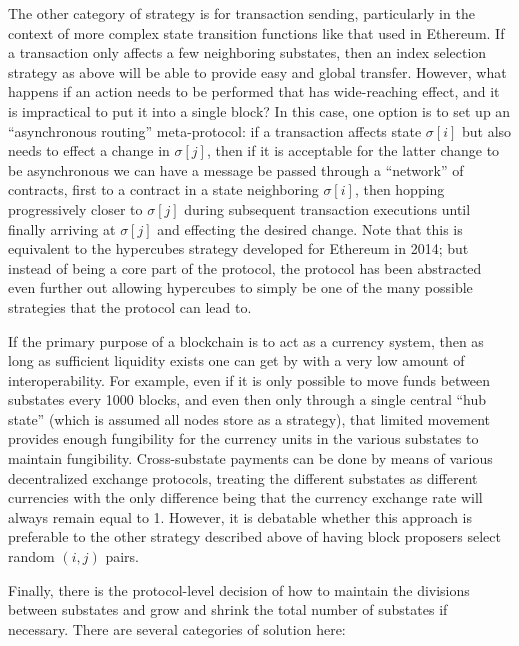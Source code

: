 \documentclass[11pt,a4paper]{report}
\theoremstyle{plain}
\theoremstyle{definition}
\theoremstyle{remark}
\begin{document}
The other category of strategy is for transaction sending, particularly in the context of more complex state transition functions like that used in Ethereum. If a transaction only affects a few neighboring substates, then an index selection strategy as above will be able to provide easy and global transfer. However, what happens if an action needs to be performed that has wide-reaching effect, and it is impractical to put it into a single block? In this case, one option is to set up an ``asynchronous routing'' meta-protocol: if a transaction affects state $\sigma[i]$ but also needs to effect a change in $\sigma[j]$, then if it is acceptable for the latter change to be asynchronous we can have a message be passed through a ``network'' of contracts, first to a contract in a state neighboring $\sigma[i]$, then hopping progressively closer to $\sigma[j]$ during subsequent transaction executions until finally arriving at $\sigma[j]$ and effecting the desired change. Note that this is equivalent to the hypercubes \citep{buterin_scalability_2014} strategy developed for Ethereum in 2014; but instead of being a core part of the protocol, the protocol has been abstracted even further out allowing hypercubes to simply be one of the many possible strategies that the protocol can lead to.

If the primary purpose of a blockchain is to act as a currency system, then as long as sufficient liquidity exists one can get by with a very low amount of interoperability. For example, even if it is only possible to move funds between substates every 1000 blocks, and even then only through a single central ``hub state'' (which is assumed all nodes store as a strategy), that limited movement provides enough fungibility for the currency units in the various substates to maintain fungibility. Cross-substate payments can be done by means of various decentralized exchange protocols, treating the different substates as different currencies with the only difference being that the currency exchange rate will always remain equal to 1. However, it is debatable whether this approach is preferable to the other strategy described above of having block proposers select random $(i, j)$ pairs.

Finally, there is the protocol-level decision of how to maintain the divisions between substates and grow and shrink the total number of substates if necessary. There are several categories of solution here:
\end{document}

